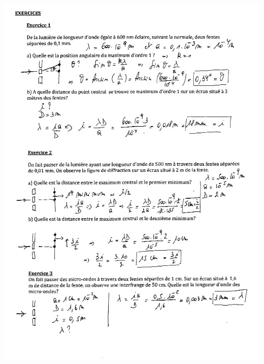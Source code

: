 \includegraphics[width=18.503cm,height=25.663cm]{Pictures/100000010000026E0000035F0050AD553CE14CB4.png}

